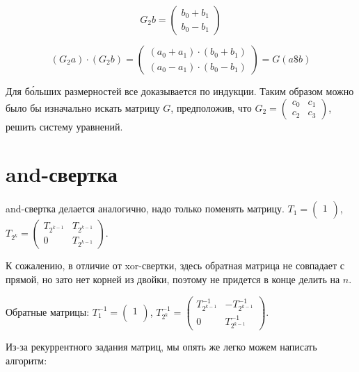 $$G_2b = 
\begin{pmatrix}
b_0 + b_1\\
b_0 - b_1
\end{pmatrix}
$$

$$(G_2a) \cdot (G_2b) = 
\begin{pmatrix}
    (a_0 + a_1) \cdot (b_0 + b_1)\\
    (a_0 - a_1) \cdot (b_0 - b_1)
\end{pmatrix}
 = G (a \$ b)$$

 Для б\'{о}льших размерностей все доказывается по индукции.
Таким образом можно было бы изначально искать матрицу $G$,
предположив, что $G_2 = 
\begin{pmatrix}
    c_0 & c_1 \\
    c_2 & c_3
\end{pmatrix}$, решить систему уравнений.

\section{and-свертка}

and-свертка делается аналогично, надо только поменять матрицу.
$T_1 = \begin{pmatrix}
    1\\
\end{pmatrix}
$,
$
T_{2^k} =  \begin{pmatrix}
    T_{2^{k - 1}} & T_{2^{k - 1}}\\
    0 & T_{2^{k - 1}}
\end{pmatrix}
$.

К сожалению, в отличие от xor-свертки, здесь обратная матрица не совпадает с прямой,
но зато нет корней из двойки, поэтому не придется в конце делить на $n$.

Обратные матрицы:
$T_1^{-1} = \begin{pmatrix}
    1\\
\end{pmatrix}
$,
$
T_{2^k}^{-1} =  \begin{pmatrix}
    T_{2^{k - 1}}^{-1} & -T_{2^{k - 1}}^{-1}\\
    0 & T_{2^{k - 1}}^{-1}
\end{pmatrix}
$.

Из-за рекуррентного задания матриц, мы опять же легко можем написать алгоритм:

